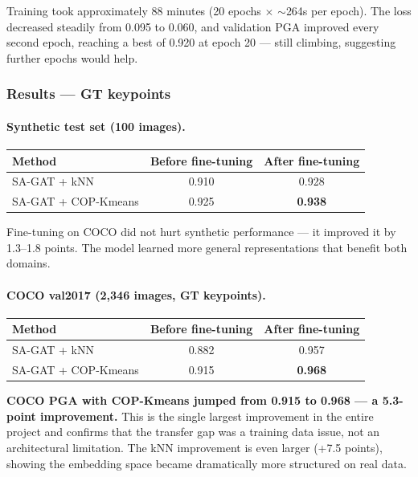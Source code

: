 Training took approximately 88 minutes (20 epochs $\times$ $\sim$264s per epoch). The loss decreased steadily from 0.095 to 0.060, and validation PGA improved every second epoch, reaching a best of 0.920 at epoch 20 --- still climbing, suggesting further epochs would help.

\subsubsection{Results --- GT keypoints}

\paragraph{Synthetic test set (100 images).}

\begin{tabular}{lcc}
\hline
\textbf{Method} & \textbf{Before fine-tuning} & \textbf{After fine-tuning} \\
\hline
SA-GAT + kNN & 0.910 & 0.928 \\
SA-GAT + COP-Kmeans & 0.925 & \textbf{0.938} \\
\hline
\end{tabular}

\vspace{0.5em}

Fine-tuning on COCO did not hurt synthetic performance --- it improved it by 1.3--1.8 points. The model learned more general representations that benefit both domains.

\paragraph{COCO val2017 (2,346 images, GT keypoints).}

\begin{tabular}{lcc}
\hline
\textbf{Method} & \textbf{Before fine-tuning} & \textbf{After fine-tuning} \\
\hline
SA-GAT + kNN & 0.882 & 0.957 \\
SA-GAT + COP-Kmeans & 0.915 & \textbf{0.968} \\
\hline
\end{tabular}

\vspace{0.5em}

\textbf{COCO PGA with COP-Kmeans jumped from 0.915 to 0.968 --- a 5.3-point improvement.} This is the single largest improvement in the entire project and confirms that the transfer gap was a training data issue, not an architectural limitation. The kNN improvement is even larger (+7.5 points), showing the embedding space became dramatically more structured on real data.

